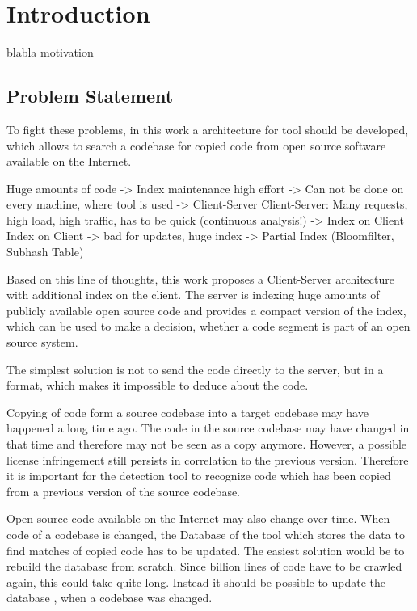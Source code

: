 
\chapter{Introduction}\label{chapter:introduction}
blabla motivation

\section{Problem Statement}\label{section:introduction/problem}

To fight these problems, in this work a architecture for tool should be developed, which allows to search a codebase for copied code from open source software available on the Internet.

Huge amounts of code -> Index maintenance high effort -> Can not be done on every machine, where tool is used -> Client-Server
Client-Server: Many requests, high load, high traffic, has to be quick (continuous analysis!) -> Index on Client
Index on Client -> bad for updates, huge index -> Partial Index (Bloomfilter, Subhash Table)

Based on this line of thoughts, this work proposes a Client-Server architecture with additional index on the client.
The server is indexing huge amounts of publicly available open source code and provides a compact version of the index, which can be used to make a decision, whether a code segment is part of an open source system.

The simplest solution is not to send the code directly to the server, but in a format, which makes it impossible to deduce about the code.


Copying of code form a source codebase into a target codebase may have happened a long time ago.
The code in the source codebase may have changed in that time and therefore may not be seen as a copy anymore.
However, a possible license infringement still persists in correlation to the previous version.
Therefore it is important for the detection tool to recognize code which has been copied from a previous version of the source codebase.

Open source code available on the Internet may also change over time.
When code of a codebase is changed, the Database of the tool which stores the data to find matches of copied code has to be updated.
The easiest solution would be to rebuild the database from scratch.
Since billion lines of code have to be crawled again, this could take quite long.
Instead it should be possible to update the database , when a codebase was changed.

